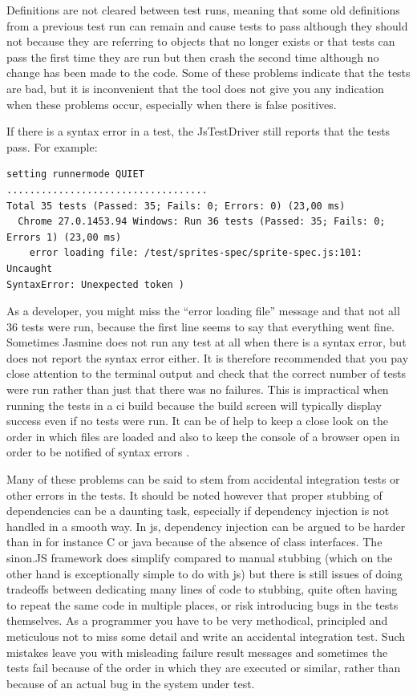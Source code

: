 \documentclass[11pt]{article}
\begin{document}
Definitions are not cleared between test runs, meaning that some old definitions from a previous test run can remain and cause tests to pass although they should not because they are referring to objects that no longer exists or that tests can pass the first time they are run but then crash the second time although no change has been made to the code. Some of these problems indicate that the tests are bad, but it is inconvenient that the tool does not give you any indication when these problems occur, especially when there is false positives.

If there is a syntax error in a test, the JsTestDriver still reports that the tests pass. For example:

\begin{verbatim}
setting runnermode QUIET
...................................
Total 35 tests (Passed: 35; Fails: 0; Errors: 0) (23,00 ms)
  Chrome 27.0.1453.94 Windows: Run 36 tests (Passed: 35; Fails: 0;
Errors 1) (23,00 ms)
    error loading file: /test/sprites-spec/sprite-spec.js:101: Uncaught
SyntaxError: Unexpected token )
\end{verbatim}

As a developer, you might miss the ``error loading file'' message and that not all 36 tests were run, because the first line seems to say that everything went fine. Sometimes Jasmine does not run any test at all when there is a syntax error, but does not report the syntax error either. It is therefore recommended that you pay close attention to the terminal output and check that the correct number of tests were run rather than just that there was no failures. This is impractical when running the tests in a \gls{ci} build because the build screen will typically display success even if no tests were run. It can be of help to keep a close look on the order in which files are loaded and also to keep the console of a browser open in order to be notified of syntax errors \cite{MikeJansen}.

Many of these problems can be said to stem from accidental integration tests or other errors in the tests. It should be noted however that proper stubbing of dependencies can be a daunting task, especially if dependency injection is not handled in a smooth way. In \gls{js}, dependency injection can be argued to be harder than in for instance C or java because of the absence of class interfaces. The sinon.JS framework does simplify compared to manual stubbing (which on the other hand is exceptionally simple to do with \gls{js}) but there is still issues of doing tradeoffs between dedicating many lines of code to stubbing, quite often having to repeat the same code in multiple places, or risk introducing bugs in the tests themselves. As a programmer you have to be very methodical, principled and meticulous not to miss some detail and write an accidental integration test. Such mistakes leave you with misleading failure result messages and sometimes the tests fail because of the order in which they are executed or similar, rather than because of an actual bug in the system under test.
\end{document}
